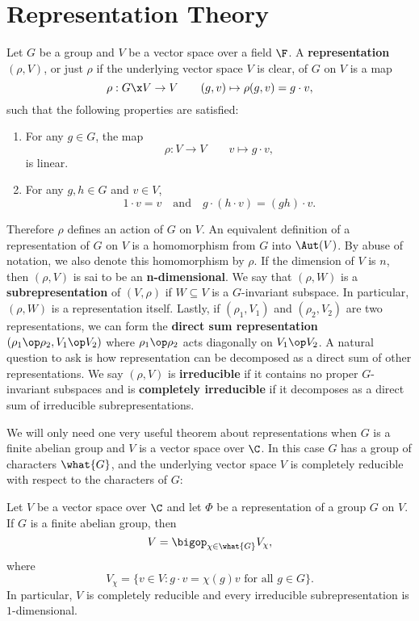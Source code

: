   \section{Representation Theory}\label{append:Representation_Theory}
    Let $G$ be a group and $V$ be a vector space over a field $\F$. A \textbf{representation} $(\rho,V)$, or just $\rho$ if the underlying vector space $V$ is clear, of $G$ on $V$ is a map
    \[
      \rho:G \x V \to V \qquad (g,v) \mapsto \rho(g,v) = g \cdot v,
    \]
    such that the following properties are satisfied:
    \begin{enumerate}
      \item For any $g \in G$, the map
      \[
        \rho:V \to V \qquad v \mapsto g \cdot v,
      \]
      is linear.
      \item For any $g,h \in G$ and $v \in V$,
      \[
        1 \cdot v = v \quad \text{and} \quad g \cdot (h \cdot v) = (gh) \cdot v.
      \]
    \end{enumerate}
    Therefore $\rho$ defines an action of $G$ on $V$. An equivalent definition of a representation of $G$ on $V$ is a homomorphism from $G$ into $\Aut(V)$. By abuse of notation, we also denote this homomorphism by $\rho$. If the dimension of $V$ is $n$, then $(\rho,V)$ is sai to be an \textbf{n-dimensional}. We say that $(\rho,W)$ is a \textbf{subrepresentation} of $(V,\rho)$ if $W \subseteq V$ is a $G$-invariant subspace. In particular, $(\rho,W)$ is a representation itself. Lastly, if $(\rho_{1},V_{1})$ and $(\rho_{2},V_{2})$ are two representations, we can form the \textbf{direct sum representation} $(\rho_{1} \op \rho_{2},V_{1} \op V_{2})$ where $\rho_{1} \op \rho_{2}$ acts diagonally on $V_{1} \op V_{2}$. A natural question to ask is how representation can be decomposed as a direct sum of other representations. We say $(\rho,V)$ is \textbf{irreducible} if it contains no proper $G$-invariant subspaces and is \textbf{completely irreducible} if it decomposes as a direct sum of irreducible subrepresentations.

    We will only need one very useful theorem about representations when $G$ is a finite abelian group and $V$ is a vector space over $\C$. In this case $G$ has a group of characters $\what{G}$, and the underlying vector space $V$ is completely reducible with respect to the characters of $G$:

    \begin{theorem}\label{thm:finite_abelian_representation_is_completely_reducible}
      Let $V$ be a vector space over $\C$ and let $\Phi$ be a representation of a group $G$ on $V$. If $G$ is a finite abelian group, then
      \[
        V = \bigop_{\chi \in \what{G}}V_{\chi},
      \]
      where
      \[
        V_{\chi} = \{v \in V:g \cdot v = \chi(g)v \text{ for all } g \in G\}.
      \]
      In particular, $V$ is completely reducible and every irreducible subrepresentation is $1$-dimensional.
    \end{theorem}
